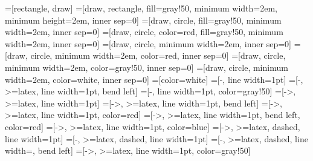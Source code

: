 \newcommand\independent{\protect\mathpalette{\protect\independenT}{\perp}}\def\independenT#1#2{\mathrel{\rlap{$#1#2$}\mkern2mu{#1#2}}} 
\renewcommand{\d}{\text{\xspace d}}
\newcommand{\gv}{\mid}
\newcommand{\ggv}{\, \| \, }
\newcommand{\card}[1]{\text{card}\left(#1\right)}
\newcommand{\trace}[1]{\text{tr}\left(#1\right)}
\newcommand{\matr}[1]{\boldsymbol{#1}}
\newcommand{\matrbf}[1]{\mathbf{#1}}
\newcommand{\vect}[1]{\matr{#1}} %
\newcommand{\vectbf}[1]{\matrbf{#1}} %
\newcommand{\trans}{\intercal}
\newcommand{\transpose}[1]{\matr{#1}^\trans}
\newcommand{\crossprod}[2]{\transpose{#1} \matr{#2}}
\newcommand{\tcrossprod}[2]{\matr{#1} \transpose{#2}}
\newcommand{\matprod}[2]{\matr{#1} \matr{#2}}
\DeclareMathOperator*{\argmin}{arg\,min}
\DeclareMathOperator*{\argmax}{arg\,max}
\DeclareMathOperator{\sign}{sign}
\DeclareMathOperator{\tr}{tr}
\newcommand{\ra}{\emphase{$\rightarrow$} \xspace}

\DeclareMathOperator{\Diag}{Diag} %
\DeclareMathOperator{\diag}{diag} %
\DeclareMathOperator{\mtov}{vec} %
\newcommand{\kro}{\otimes} %
\newcommand{\had}{\odot}   %

\newcommand{\nodesize}{2em}
\newcommand{\edgeunit}{2.5*\nodesize}
=[rectangle, draw]
=[draw, rectangle, fill=gray!50, minimum width=\nodesize, minimum height=\nodesize, inner sep=0]
=[draw, circle, fill=gray!50, minimum width=\nodesize, inner sep=0]
=[draw, circle, color=red, fill=gray!50, minimum width=\nodesize, inner sep=0]
=[draw, circle, minimum width=\nodesize, inner sep=0]
=[draw, circle, minimum width=\nodesize, color=red, inner sep=0]
=[draw, circle, minimum width=\nodesize, color=gray!50, inner sep=0]
=[draw, circle, minimum width=\nodesize, color=white, inner sep=0]
=[color=white]
=[-, line width=1pt]
=[-, >=latex, line width=1pt, bend left]
=[-, line width=1pt, color=gray!50]
=[->, >=latex, line width=1pt]
=[->, >=latex, line width=1pt, bend left]
=[->, >=latex, line width=1pt, color=red]
=[->, >=latex, line width=1pt, bend left, color=red]
=[->, >=latex, line width=1pt, color=blue]
=[->, >=latex, dashed, line width=1pt]
=[-, >=latex, dashed, line width=1pt]
=[-, >=latex, dashed, line width=\edgewidth, bend left]
=[->, >=latex, line width=1pt, color=gray!50]
